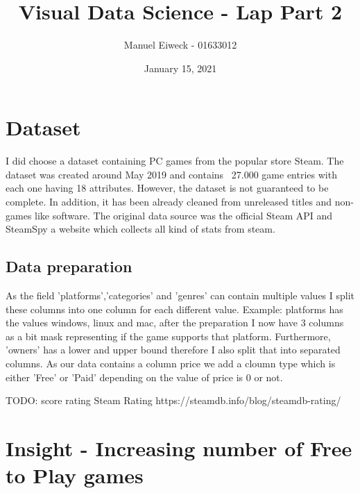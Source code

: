 \documentclass[11pt]{article}
\title{Visual Data Science - Lap Part 2}
\author{Manuel Eiweck - 01633012}
\date{January 15, 2021}
\begin{document}
\maketitle


\section{Dataset}

I did choose a dataset containing PC games from the popular store Steam. The dataset was created around May 2019 and contains ~27.000 game entries with each one having 18 attributes.
However, the dataset is not guaranteed to be complete. In addition, it has been already cleaned from unreleased titles and non-games like software. The original data source was the official Steam API and SteamSpy a website which collects all kind of stats from steam.

\subsection{Data preparation}

As the field 'platforms','categories' and 'genres' can contain multiple values I split these columns into one column for each different value. Example: platforms has the values windows, linux and mac, after the preparation I now have 3 columns as a bit mask representing if the game supports that platform. Furthermore, 'owners' has a lower and upper bound therefore I also split that into separated columns. As our data contains a column price we add a cloumn type which is either 'Free' or 'Paid' depending on the value of price is 0 or not.

TODO: score rating
Steam Rating
https://steamdb.info/blog/steamdb-rating/

\section{Insight - Increasing number of Free to Play games}
\end{document}

